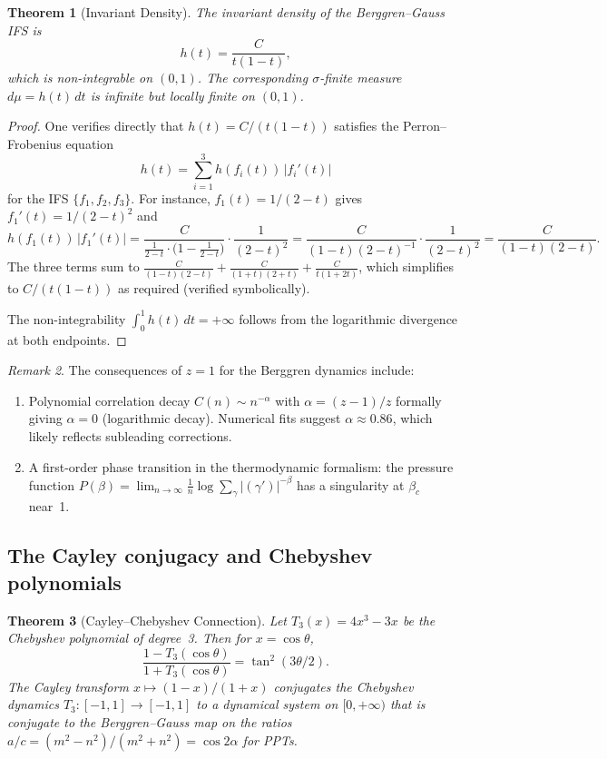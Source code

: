 \documentclass[12pt]{amsart}
\newtheorem{theorem}{Theorem}[section]
\theoremstyle{definition}
\theoremstyle{remark}
\newtheorem{remark}[theorem]{Remark}
\begin{document}
\begin{theorem}[Invariant Density]\label{thm:density}
The invariant density of the Berggren--Gauss IFS is
\begin{equation}\label{eq:density}
h(t) = \frac{C}{t(1-t)},
\end{equation}
which is non-integrable on $(0,1)$.  The corresponding
$\sigma$-finite measure $d\mu = h(t)\,dt$ is infinite but locally
finite on $(0,1)$.
\end{theorem}

\begin{proof}
One verifies directly that $h(t) = C/(t(1-t))$ satisfies the
Perron--Frobenius equation
\[
h(t) = \sum_{i=1}^{3} h(f_i(t))\, |f_i'(t)|
\]
for the IFS $\{f_1, f_2, f_3\}$.  For instance, $f_1(t) = 1/(2-t)$
gives $f_1'(t) = 1/(2-t)^2$ and
\[
h(f_1(t))\,|f_1'(t)| =
\frac{C}{\frac{1}{2-t}\cdot\bigl(1-\frac{1}{2-t}\bigr)} \cdot
\frac{1}{(2-t)^2}
= \frac{C}{(1-t)(2-t)^{-1}} \cdot \frac{1}{(2-t)^2}
= \frac{C}{(1-t)(2-t)}.
\]
The three terms sum to
$\frac{C}{(1-t)(2-t)} + \frac{C}{(1+t)(2+t)} + \frac{C}{t(1+2t)}$,
which simplifies to $C/(t(1-t))$ as required (verified symbolically).

The non-integrability $\int_0^1 h(t)\,dt = +\infty$ follows from the
logarithmic divergence at both endpoints.
\end{proof}

\begin{remark}
The consequences of $z=1$ for the Berggren dynamics include:
\begin{enumerate}[label=(\alph*)]
\item Polynomial correlation decay $C(n) \sim n^{-\alpha}$ with
$\alpha = (z-1)/z$ formally giving $\alpha = 0$ (logarithmic decay).
Numerical fits suggest $\alpha \approx 0.86$, which likely reflects
subleading corrections.
\item A first-order phase transition in the thermodynamic formalism:
the pressure function $P(\beta) = \lim_{n\to\infty}
\frac{1}{n}\log\sum_{\gamma}|(\gamma')|^{-\beta}$ has a singularity
at $\beta_c$ near~1.
\end{enumerate}
\end{remark}

\subsection{The Cayley conjugacy and Chebyshev polynomials}

\begin{theorem}[Cayley--Chebyshev Connection]\label{thm:cayley}
Let $T_3(x) = 4x^3 - 3x$ be the Chebyshev polynomial of degree~3.
Then for $x = \cos\theta$,
\begin{equation}\label{eq:cayley}
\frac{1 - T_3(\cos\theta)}{1 + T_3(\cos\theta)} = \tan^2(3\theta/2).
\end{equation}
The Cayley transform $x \mapsto (1-x)/(1+x)$ conjugates the Chebyshev
dynamics $T_3\colon [-1,1]\to[-1,1]$ to a dynamical system on
$[0,+\infty)$ that is conjugate to the Berggren--Gauss map on the
ratios $a/c = (m^2-n^2)/(m^2+n^2) = \cos 2\alpha$ for PPTs.
\end{theorem}
\end{document}
